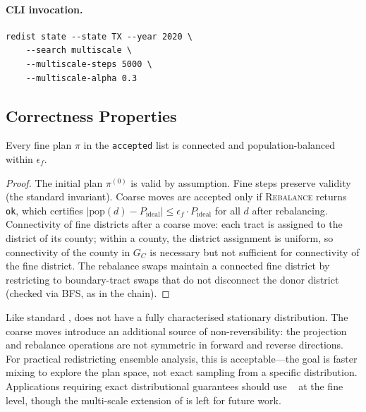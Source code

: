 \paragraph{CLI invocation.}
\begin{verbatim}
redist state --state TX --year 2020 \
    --search multiscale \
    --multiscale-steps 5000 \
    --multiscale-alpha 0.3
\end{verbatim}

\subsection{Correctness Properties}

\begin{proposition}[Fine plan validity]
\label{prop:validity}
Every fine plan $\pi$ in the \texttt{accepted} list is connected and
population-balanced within $\epsilon_f$.
\end{proposition}

\begin{proof}
The initial plan $\pi^{(0)}$ is valid by assumption.
Fine \recom{} steps preserve validity (the standard \recom{} invariant).
Coarse moves are accepted only if \textsc{Rebalance} returns \texttt{ok},
which certifies $|\mathrm{pop}(d) - P_{\mathrm{ideal}}| \leq \epsilon_f \cdot
P_{\mathrm{ideal}}$ for all $d$ after rebalancing.
Connectivity of fine districts after a coarse move: each tract is assigned
to the district of its county; within a county, the district assignment is
uniform, so connectivity of the county in $G_C$ is necessary but not
sufficient for connectivity of the fine district.
The rebalance swaps maintain a connected fine district by restricting to
boundary-tract swaps that do not disconnect the donor district (checked via
BFS, as in the \flip{} chain).
\end{proof}

\begin{remark}[Stationarity]
\label{rem:stationarity}
Like standard \recom{}, \ms{} does not have a fully characterised stationary
distribution.
The coarse moves introduce an additional source of non-reversibility: the
projection and rebalance operations are not symmetric in forward and reverse
directions.
For practical redistricting ensemble analysis, this is acceptable---the goal
is faster mixing to explore the plan space, not exact sampling from a specific
distribution.
Applications requiring exact distributional guarantees should use
\fr{}~\citep{dellaLibera2026forestRecom} at the fine level, though the
multi-scale extension of \fr{} is left for future work.
\end{remark}
